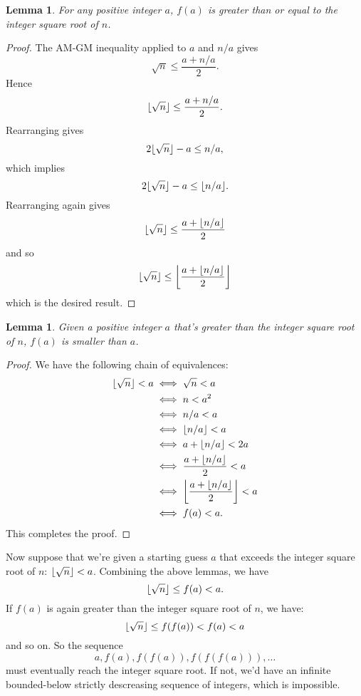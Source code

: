\documentclass[a4paper]{article}
\DeclarePairedDelimiter\floor{\lfloor}{\rfloor}
\theoremstyle{plain}
\newtheorem{lemma}[theorem]{Lemma}
\theoremstyle{definition}
\begin{document}
\begin{lemma}
  For any positive integer $a$, $f(a)$ is greater than or equal to the
  integer square root of $n$.
\end{lemma}

\begin{proof}
  The AM-GM inequality applied to $a$ and $n/a$ gives
  $$\sqrt n \le \frac{a + n/a}2.$$
  Hence
  $$\floor{\sqrt n} \le \frac{a + n/a}2.$$
  Rearranging gives
  $$2\floor{\sqrt n} -a \le n/a,$$
  which implies
  $$2\floor{\sqrt n} - a \le \floor{n/a}.$$
  Rearranging again gives
  $$\floor{\sqrt n} \le \frac{a + \floor{n/a}}2$$
  and so
  $$\floor{\sqrt n} \le \floor*{\frac{a + \floor{n/a}}2}$$
  which is the desired result.
\end{proof}

\begin{lemma}
  Given a positive integer $a$ that's greater than the integer square
  root of $n$, $f(a)$ is smaller than $a$.
\end{lemma}

\begin{proof}
  We have the following chain of equivalences:
  \begin{align}
    \floor{\sqrt n} < a &\iff \sqrt n < a \\
                        &\iff n < a^2 \\
                        &\iff n/a < a \\
                        &\iff \floor{n/a} < a \\
                        &\iff a + \floor{n/a} < 2a \\
                        &\iff \frac{a + \floor{n/a}}2 < a \\
                        &\iff \floor*{\frac{a + \floor{n/a}}2} < a \\
                        &\iff f(a) < a.
  \end{align}
  This completes the proof.
\end{proof}

Now suppose that we're given a starting guess $a$ that exceeds the integer
square root of $n$: $\floor{\sqrt n} < a$. Combining the above lemmas,
we have
$$\floor{\sqrt n} \le f(a) < a.$$ If $f(a)$ is again greater than the integer
square root of $n$, we have:
$$\floor{\sqrt n} \le f(f(a)) < f(a) < a$$ and so on. So the sequence
$$a, f(a), f(f(a)), f(f(f(a))), \dots$$
must eventually reach the integer square root. If not, we'd have an infinite
bounded-below strictly descreasing sequence of integers, which is impossible.
\end{document}
